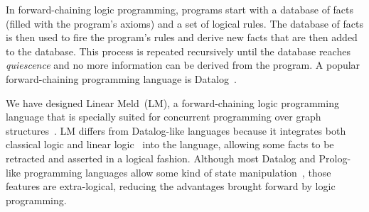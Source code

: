\iffalse
Logic programming languages split into two main
groups: \emph{backwards-chaining} and \emph{forward-chaining}. In a
backwards-chaining logic programming language, programs are composed
of a set of rules that can be activated by inputting a query. Given a
query $q(\hat{x})$, an interpreter will work backwards by matching
$q(\hat{x})$ against the head of a rule. If found, the interpreter
will then try to match the body of the rule, recursively, until it
finds the program axioms (rules without body). If the search procedure
succeeds, the interpreter finds a valid substitution for the $\hat{x}$
variables. A popular backwards-chaining programming language is
Prolog~\cite{Colmerauer:1993:BP:154766.155362}, which has been a
productive research language for executing logic programs in
parallel. Researchers took advantage of Prolog's non-determinism to
evaluate subgoals in parallel with models such
as \emph{And-parallelism}
and \emph{Or-parallelism}~\cite{Gupta:2001:PEP:504083.504085}.
\fi

In forward-chaining logic programming, programs start with
a database of facts (filled with the program's axioms) and a set of
logical rules. The database of facts is then used to fire the
program's rules and derive new facts that are then added to the
database. This process is repeated recursively until the database
reaches \emph{quiescence} and no more information can be derived from
the program. A popular forward-chaining programming language is
Datalog~\cite{Ramakrishnan93asurvey}.

We have designed Linear Meld~(LM), a forward-chaining logic programming
language that is specially suited for
concurrent programming over graph structures~\cite{cruz-iclp14}. LM
differs from Datalog-like languages because it integrates both
classical logic and linear logic~\cite{girard-87} into the language, allowing some
facts to be retracted and asserted in a logical fashion. Although most
Datalog and Prolog-like programming languages allow some kind of state
manipulation~\cite{Liu98extendingdatalog}, those features are
extra-logical, reducing the advantages brought forward by logic programming.

